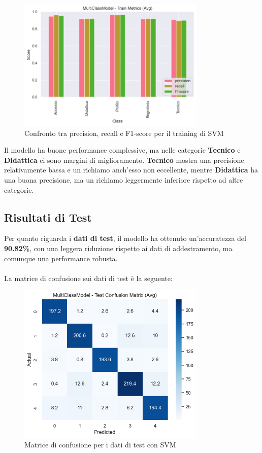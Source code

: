 \begin{figure}[H]
    \centering
    \includegraphics[width=0.8\textwidth]{images/metrics_train_svm.png}
    \caption{Confronto tra precision, recall e F1-score per il training di SVM}
    \label{fig:metrics_train_svm}
\end{figure}

Il modello ha buone performance complessive, ma nelle categorie \textbf{Tecnico} e \textbf{Didattica} ci sono margini di miglioramento. \textbf{Tecnico} mostra una precisione relativamente bassa e un richiamo anch'esso non eccellente, mentre \textbf{Didattica} ha una buona precisione, ma un richiamo leggermente inferiore rispetto ad altre categorie.

\newpage

\subsection{Risultati di Test}

Per quanto riguarda i \textbf{dati di test}, il modello ha ottenuto un'accuratezza del \textbf{90.82\%}, con una leggera riduzione rispetto ai dati di addestramento, ma comunque una performance robusta. \\ \\
La matrice di confusione sui dati di test è la seguente:

\begin{figure}[H]
    \centering
    \includegraphics[width=0.8\textwidth]{images/confusion_matrix_test_svm.png}
    \caption{Matrice di confusione per i dati di test con SVM}
    \label{fig:confusion_matrix_test_svm}
\end{figure}

